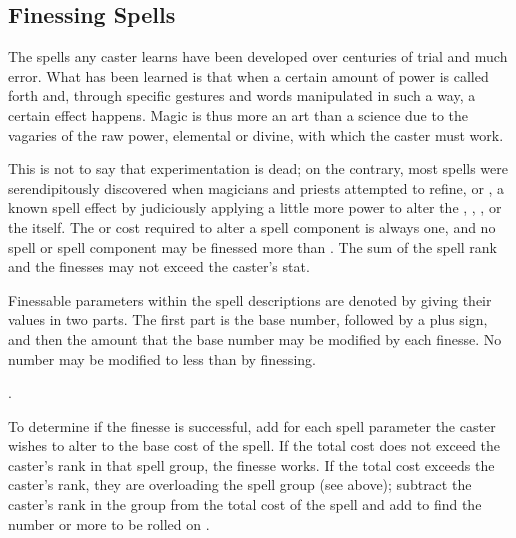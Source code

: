 \begin{multicols}{2}
\subsection{Finessing Spells}
The spells any caster learns have been developed over centuries of trial and much error. What has been learned is that when a certain amount of power is called forth and, through specific gestures and words manipulated in such a way, a certain effect happens. Magic is thus more an art than a science due to the vagaries of the raw power, elemental or divine, with which the caster must work.

This is not to say that experimentation is dead; on the contrary, most spells were serendipitously discovered when magicians and priests attempted to refine, or , a known spell effect by judiciously applying a little more power to alter the , , , or the  itself. The \EU or \DU cost required to alter a spell component is always one, and no spell or spell component may be finessed more than . The sum of the spell rank and the finesses may not exceed the caster's \PWR stat.

Finessable parameters within the spell descriptions are denoted by giving their values in two parts. The first part is the base number, followed by a plus sign, and then the
amount that the base number may be modified by each finesse. No number may be modified to less than  by finessing.

. 

To determine if the finesse is successful, add  for each spell parameter the caster wishes to alter to the base cost of the spell. If the total cost does not exceed the caster's rank in that spell group, the finesse works. If the total cost exceeds the caster's rank, they are overloading the spell group (see above); subtract the caster's rank in the group from the total cost of the spell and add  to find the number or more to be rolled on .


\end{multicols}
